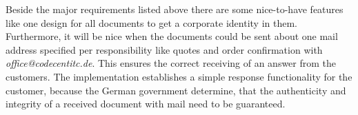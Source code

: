 Beside the major requirements listed above there are some nice-to-have features like one design for all documents to get a corporate identity in them. Furthermore, it will be nice when the documents could be sent about one mail address specified per responsibility like quotes and order confirmation with \textit{office@codecentitc.de}. This ensures the correct receiving of an answer from the customers. The implementation establishes a simple response functionality for the customer, because the German government determine, that the authenticity and integrity of a received document with mail need to be guaranteed. 
